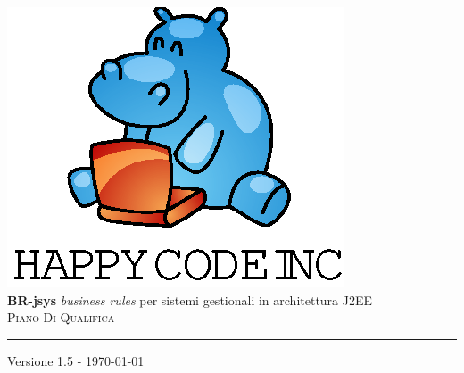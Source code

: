 \documentclass[11pt,titlepage,a4paper]{report}
\begin{document}
\newcommand{\lv}{ 1.5 } %
\newcommand{\dt}{ Piano Di Qualifica }%
\newcommand{\PianoDiProgetto}{ PianoDiProgetto.1.0.pdf }
\newcommand{\Glossario}{ Glossario.1.4.pdf }


\begin{titlepage}\begin{center}
\vspace*{0.5in}
\includegraphics{logo.eps}
\vspace*{0.2in} \\
{\Large \textbf{BR-jsys}}
{\Large \emph{business rules} per sistemi gestionali in architettura J2EE } 
\vspace{2in} \\
\Huge \textsc{ \dt }
\par\rule{10cm}{0.4pt} \par {\large Versione \lv - \today} \\
\end{center}\end{titlepage}
\vspace*{0.5in}
\end{document}

